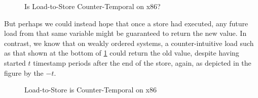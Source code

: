 {\begin{figure}
\centering
{}
\caption{Is Load-to-Store Counter-Temporal on x86?}
\label{fig:memorder:Is Load-to-Store Counter-Temporal on x86?}
\end{figure}

	But perhaps we could instead hope that once a store had
	executed, any future load from that same variable might
	be guaranteed to return the new value.
	In contrast, we know that on weakly ordered systems, a
	counter-intuitive load such as that shown at the bottom
	of
	\cref{fig:memorder:Is Load-to-Store Counter-Temporal on x86?}
	could return the old value, despite having started $t$
	timestamp periods after the end of the store, again, as
	depicted in the figure by the $-t$.

\begin{figure}
\centering
{}
\caption{Load-to-Store is Counter-Temporal on x86}
\label{fig:memorder:Load-to-Store is Counter-Temporal on x86}
\end{figure}

}
